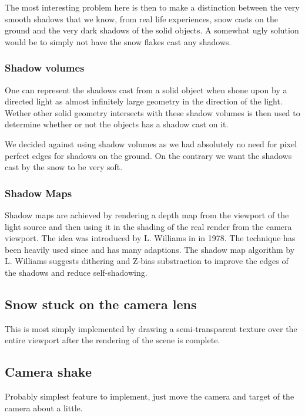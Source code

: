 \documentclass[a4paper,12pt]{article}
\begin{document}
The most interesting problem here is then to make a distinction between the very smooth shadows that we know, from real life experiences, snow casts on the ground and the very dark shadows of the solid objects. A somewhat ugly solution would be to simply not have the snow flakes cast any shadows.


\subsubsection{Shadow volumes}

One can represent the shadows cast from a solid object when shone upon by a directed light as almost infinitely large geometry in the direction of the light. Wether other solid geometry intersects with these shadow volumes is then used to determine whether or not the objects has a shadow cast on it.

We decided against using shadow volumes as we had absolutely no need for pixel perfect edges for shadows on the ground. On the contrary we want the shadows cast by the snow to be very soft.


\subsubsection{Shadow Maps}

Shadow maps are achieved by rendering a depth map from the viewport of the light source and then using it in the shading of the real render from the camera viewport. The idea was introduced by L. Williams in \cite{shadow-maps} in 1978. The technique has been heavily used since and has many adaptions. The shadow map algorithm by L. Williams suggests dithering and Z-bias substraction to improve the edges of the shadows and reduce self-shadowing.

\subsection{Snow stuck on the camera lens}

This is most simply implemented by drawing a semi-transparent texture over the entire viewport after the rendering of the scene is complete.

\subsection{Camera shake}

Probably simplest feature to implement, just move the camera and target of the camera about a little.
\end{document}
